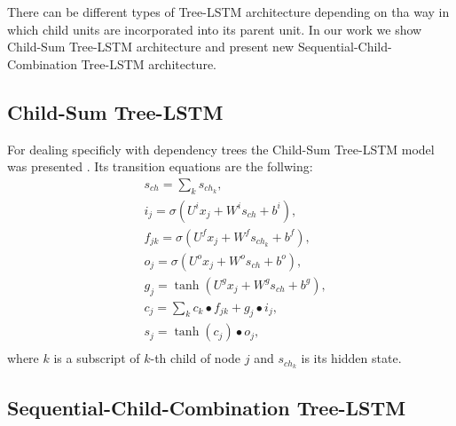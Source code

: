 \documentclass[10pt, a4paper]{article}
\begin{document}
	There can be different types of Tree-LSTM architecture depending on tha way in which child units are incorporated into its parent unit. In our work we show Child-Sum Tree-LSTM architecture \cite{tai2015improved} and present new Sequential-Child-Combination Tree-LSTM architecture.\\
\subsection{Child-Sum Tree-LSTM}

 For dealing specificly with dependency trees the Child-Sum Tree-LSTM model was presented \cite{tai2015improved}. Its transition equations are the follwing:
\begin{equation}
\begin{split}
&s_{ch}=\sum_{k}s_{ch_k},\\
&i_j = \sigma(U^ix_j + W^is_{ch} + b^i) ,\\
&f_{jk} = \sigma(U^fx_j + W^fs_{ch_k} + b^f) ,\\
&o_j = \sigma(U^ox_j + W^os_{ch} + b^o) ,\\
&g_j = \tanh(U^gx_j+ W^gs_{ch} + b^g) ,\\
&c_j = \sum_{k} c_k \bullet f_{jk} + g_{j} \bullet i_{j} ,\\
&s_j = \tanh({c_{j}}) \bullet o_{j},\\
\end{split}
\end{equation}
	where $k$ is a subscript of $k$-th child of node $j$ and $s_{ch_k}$ is its hidden state.
\subsection{Sequential-Child-Combination Tree-LSTM}
\end{document}

